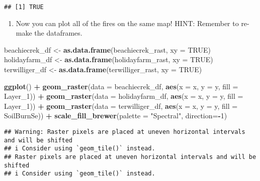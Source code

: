 \documentclass[
]{article}
\newenvironment{Shaded}{\begin{snugshade}}{\end{snugshade}}
\newcommand{\AttributeTok}[1]{\textcolor[rgb]{0.13,0.29,0.53}{#1}}
\newcommand{\ConstantTok}[1]{\textcolor[rgb]{0.56,0.35,0.01}{#1}}
\newcommand{\DecValTok}[1]{\textcolor[rgb]{0.00,0.00,0.81}{#1}}
\newcommand{\FunctionTok}[1]{\textcolor[rgb]{0.13,0.29,0.53}{\textbf{#1}}}
\newcommand{\NormalTok}[1]{#1}
\newcommand{\OtherTok}[1]{\textcolor[rgb]{0.56,0.35,0.01}{#1}}
\newcommand{\SpecialCharTok}[1]{\textcolor[rgb]{0.81,0.36,0.00}{\textbf{#1}}}
\newcommand{\StringTok}[1]{\textcolor[rgb]{0.31,0.60,0.02}{#1}}
\providecommand{\tightlist}{%
  \setlength{\itemsep}{0pt}\setlength{\parskip}{0pt}}
\begin{document}
\begin{verbatim}
## [1] TRUE
\end{verbatim}

\begin{enumerate}
\def\labelenumi{\alph{enumi}.}
\setcounter{enumi}{2}
\tightlist
\item
  Now you can plot all of the fires on the same map! HINT: Remember to
  re-make the dataframes.
\end{enumerate}

\begin{Shaded}
\begin{Highlighting}[]
\NormalTok{beachiecrek\_df }\OtherTok{\textless{}{-}} \FunctionTok{as.data.frame}\NormalTok{(beachiecrek\_rast, }\AttributeTok{xy =} \ConstantTok{TRUE}\NormalTok{)}
\NormalTok{holidayfarm\_df }\OtherTok{\textless{}{-}} \FunctionTok{as.data.frame}\NormalTok{(holidayfarm\_rast, }\AttributeTok{xy =} \ConstantTok{TRUE}\NormalTok{)}
\NormalTok{terwilliger\_df }\OtherTok{\textless{}{-}} \FunctionTok{as.data.frame}\NormalTok{(terwilliger\_rast, }\AttributeTok{xy =} \ConstantTok{TRUE}\NormalTok{)}

\FunctionTok{ggplot}\NormalTok{() }\SpecialCharTok{+}
  \FunctionTok{geom\_raster}\NormalTok{(}\AttributeTok{data =}\NormalTok{ beachiecrek\_df, }\FunctionTok{aes}\NormalTok{(}\AttributeTok{x =}\NormalTok{ x, }\AttributeTok{y =}\NormalTok{ y, }\AttributeTok{fill =}\NormalTok{ Layer\_1)) }\SpecialCharTok{+}
  \FunctionTok{geom\_raster}\NormalTok{(}\AttributeTok{data =}\NormalTok{ holidayfarm\_df, }\FunctionTok{aes}\NormalTok{(}\AttributeTok{x =}\NormalTok{ x, }\AttributeTok{y =}\NormalTok{ y, }\AttributeTok{fill =}\NormalTok{ Layer\_1)) }\SpecialCharTok{+}
  \FunctionTok{geom\_raster}\NormalTok{(}\AttributeTok{data =}\NormalTok{ terwilliger\_df, }\FunctionTok{aes}\NormalTok{(}\AttributeTok{x =}\NormalTok{ x, }\AttributeTok{y =}\NormalTok{ y, }\AttributeTok{fill =}\NormalTok{ SoilBurnSe)) }\SpecialCharTok{+}
  \FunctionTok{scale\_fill\_brewer}\NormalTok{(}\AttributeTok{palette =} \StringTok{"Spectral"}\NormalTok{, }\AttributeTok{direction=}\SpecialCharTok{{-}}\DecValTok{1}\NormalTok{)}
\end{Highlighting}
\end{Shaded}

\begin{verbatim}
## Warning: Raster pixels are placed at uneven horizontal intervals and will be shifted
## i Consider using `geom_tile()` instead.
## Raster pixels are placed at uneven horizontal intervals and will be shifted
## i Consider using `geom_tile()` instead.
\end{verbatim}
\end{document}
